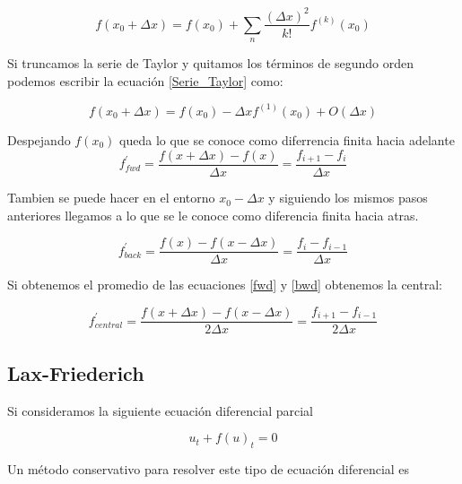 \documentclass[12pt,a4paper]{book}
\begin{document}
\begin{equation}\label{Serie_Taylor}
f\left( x_0 + \Delta x\right) = f\left( x_0 \right)+
\sum_n \frac{\left( \Delta x \right) ^2}{k!}f^{(k)} \left(x_0
\right)
\end{equation}

Si truncamos la serie de Taylor y quitamos los términos de segundo orden podemos escribir la ecuación \ref{Serie_Taylor} como:

\begin{equation}
f\left( x_0 + \Delta x \right) = f(x_0) - \Delta x f^{(1)} (x_0) + O \left( \Delta x \right)
\end{equation}

Despejando $f(x_0)$ queda lo que se conoce como diferrencia finita hacia adelante
\begin{equation}\label{fwd}
f_{fwd}^{'}=\frac{f\left(x + \Delta x \right) - f(x) }{\Delta x}=\frac{f_{i+1}-f_{i}}{\Delta x}
\end{equation}

Tambien se puede hacer en el entorno $x_0- \Delta x$ y siguiendo los mismos pasos anteriores llegamos a lo que se le conoce como diferencia finita hacia atras.



\begin{equation}\label{bwd}
f_{back}^{'}=\frac{f\left(x \right) - f(x - \Delta x) }{\Delta x}=\frac{f_{i}-f_{i-1}}{\Delta x}
\end{equation}

Si obtenemos el promedio de las ecuaciones \ref{fwd} y \ref{bwd} obtenemos la central:

\begin{equation} \label{Centrada}
f_{central}^{'}=\frac{f\left(x + \Delta x\right) - f(x - \Delta x) }{2\Delta x}=\frac{f_{i+1}-f_{i-1}}{2 \Delta x}
\end{equation}



\subsection{Lax-Friederich}

Si consideramos la siguiente ecuación diferencial parcial

\begin{equation} \label{ecu_conser}
u_t+ f\left(u \right)_t=0
\end{equation}

Un método conservativo para resolver este tipo de ecuación diferencial es 
\end{document}
